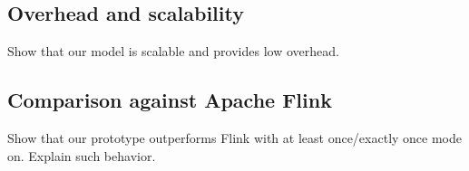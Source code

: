 
\label {fs-experiments-seciton}

\subsection{Overhead and scalability}
Show that our model is scalable and provides low overhead.

\subsection{Comparison against Apache Flink}
Show that our prototype outperforms Flink with at least once/exactly once mode on. Explain such behavior.
